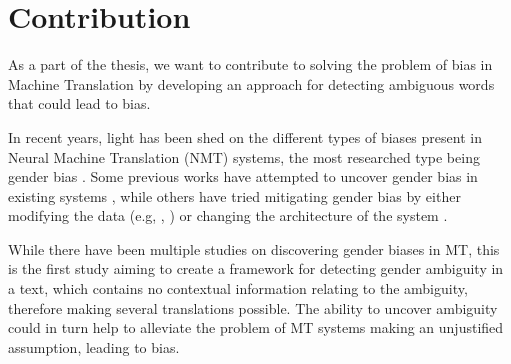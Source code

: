 
\section{Contribution}
\label{sec:Introduction:Contribution}

As a part of the thesis, we want to contribute to solving the problem of bias in Machine Translation by developing an approach for detecting ambiguous words that could lead to bias. 

In recent years, light has been shed on the different types of biases present in Neural Machine Translation (NMT) systems, the most researched type being gender bias \parencite{Savoldi_2021}. Some previous works have attempted to uncover gender bias in existing systems \parencite{Prates_2019}, while others have tried mitigating gender bias by either modifying the data (e.g, \citet{Escud_Font_2019}, \citet{Stanovsky_2019}) or changing the architecture of the system \parencite{Vanmassenhove_2018}. 

While there have been multiple studies on discovering gender biases in MT, this is the first study aiming to create a framework for detecting gender ambiguity in a text, which contains no contextual information relating to the ambiguity, therefore making several translations possible. The ability to uncover ambiguity could in turn help to alleviate the problem of MT systems making an unjustified assumption, leading to bias.


